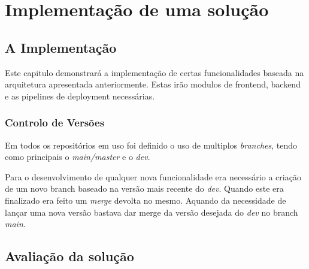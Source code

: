 \chapter{Implementação de uma solução}

\section{A Implementação}

Este capitulo demonstrará a implementação de certas funcionalidades baseada na arquitetura apresentada anteriormente. Estas irão modulos de frontend, backend e as pipelines de deployment necessárias. 





\subsection{Controlo de Versões}

Em todos os repositórios em uso foi definido o uso de multiplos \textit{branches}, tendo como principais o \textit{main/master} e o \textit{dev}. 

Para o desenvolvimento de qualquer nova funcionalidade era necessário a criação de um novo branch baseado na versão mais recente do \textit{dev}. Quando este era finalizado era feito um \textit{merge} devolta no mesmo. Aquando da necessidade de lançar uma nova versão bastava dar merge da versão desejada do \textit{dev} no branch \textit{main}.











\section{Avaliação da solução}